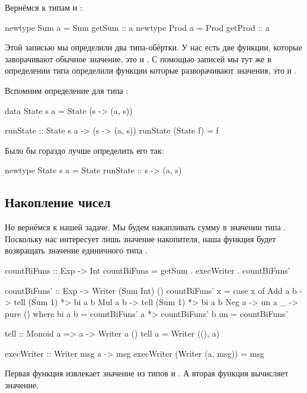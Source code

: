 Вернёмся к типам  и :


\begin{code}
newtype Sum  a = Sum  { getSum  :: a }
newtype Prod a = Prod { getProd :: a }
\end{code}

Этой записью мы определили два типа-обёртки. У нас есть две функции,
которые заворачивают обычное значение, это  и . С
помощью записей мы тут же в определении типа определили функции которые
разворачивают значения, это  и .

Вспомним определение для типа :


\begin{code}
data State s a = State (s -> (a, s))

runState :: State s a -> (s -> (a, s))
runState (State f) = f
\end{code}

Было бы гораздо лучше определить его так:


\begin{code}
newtype State s a = State{ runState :: s -> (a, s) }
\end{code}

\subsection{Накопление чисел}

Но вернёмся к нашей задаче. Мы будем накапливать сумму в значении типа
. Поскольку нас интересует лишь значение накопителя, наша
функция будет возвращать значение единичного типа \In{()}.


\begin{code}
countBiFuns :: Exp -> Int
countBiFuns = getSum . execWriter . countBiFuns'

countBiFuns' :: Exp -> Writer (Sum Int) ()
countBiFuns' x = case x of
    Add a b -> tell (Sum 1) *> bi a b
    Mul a b -> tell (Sum 1) *> bi a b
    Neg a   -> un a
    _       -> pure ()
    where bi a b = countBiFuns' a *> countBiFuns' b  
          un     = countBiFuns'

tell :: Monoid a => a -> Writer a () 
tell a = Writer ((), a)

execWriter :: Writer msg a -> msg
execWriter (Writer (a, msg)) = msg
\end{code}

Первая функция  извлекает значение из типов 
и . А вторая функция  вычисляет значение.

